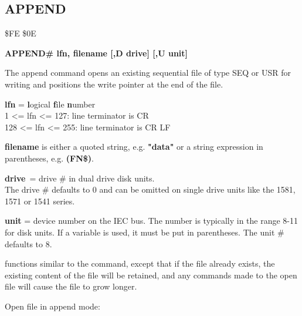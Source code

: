 \subsection{APPEND}
\begin{description}[leftmargin=3cm,style=nextline]
\item [Token:] \$FE \$0E
\item [Format:]
  {\bf APPEND\# lfn, filename [,D drive] [,U unit] }
\item [Usage:]
   The append command opens an existing sequential file of type
   SEQ or USR for writing and positions the write pointer
   at the end of the file.

   {\bf lfn} = {\bf l}ogical {\bf f}ile {\bf n}umber \\
   1 <= lfn <= 127: line terminator is CR \\
   128 <= lfn <= 255: line terminator is CR LF

   {\bf filename} is either a quoted string, e.g. {\bf "data"} or
   a string expression in parentheses, e.g. {\bf (FN\$)}.

   {\bf drive} = drive \# in dual drive disk units. \\
   The drive \# defaults to 0 and can be omitted on single drive units
   like the 1581, 1571 or 1541 series.

   {\bf unit} = device number on the IEC bus.
   The number is typically in the range 8-11 for disk units.
   If a variable is used, it must be put in parentheses.
   The unit \# defaults to 8.

\item [Remarks:]
    functions similar to the 
   command, except that if the file already
   exists, the existing content of the file will be retained, and any
    commands made to the
   open file will cause the file to grow longer.

\item [Example:] Open file in append mode:

\end{description}


\newpage
